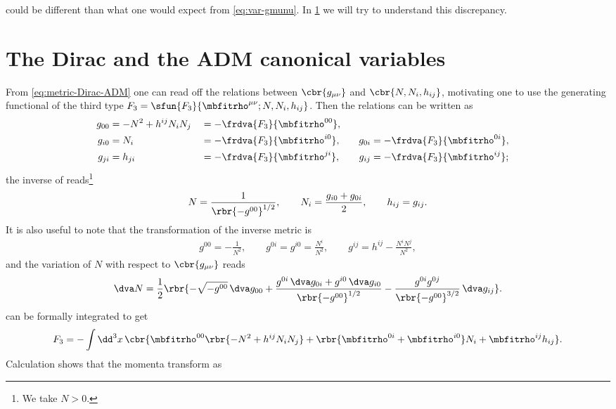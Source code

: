 \documentclass[a4paper,11pt]{article}
\begin{document}
 could be different than what one would expect from 
\cref{eq:var-gmunu}. In \cref{sec:Dirac-ADM-canonical} we will try to 
understand this discrepancy.

\section{The Dirac and the ADM canonical variables}
\label{sec:Dirac-ADM-canonical}

From \cref{eq:metric-Dirac-ADM} one can read off the relations between 
$\cbr{g_{\mu\nu}}$ and $\cbr{N, N_i, h_{ij}}$, motivating one to use the 
generating functional of the third type $F_3 = \sfun{F_3}{\mbfitrho^{\mu\nu}; 
N, N_i, h_{ij}}$. Then the relations can be written as
\begin{alignat}{5}
g_{00}
&= -N^2 + h^{ij} N_i N_j
&&= -\frdva{F_3}{\mbfitrho^{00}},
\label{eq:g00nnh}\\
g_{i0} 
&= N_i
&&= -\frdva{F_3}{\mbfitrho^{i0}}, \quad
&g_{0i}
&= -\frdva{F_3}{\mbfitrho^{0i}},
\label{eq:g0innh}\\
g_{ji}
&= h_{ji}
&&= -\frdva{F_3}{\mbfitrho^{ji}}, \quad
&g_{ij}
&= -\frdva{F_3}{\mbfitrho^{ij}};
\label{eq:gijnnh}
\end{alignat}
the inverse of  reads\footnote{We take $N > 0$.}
\begin{align}
N = \frac{1}{\rbr{-g^{00}}^{1/2}},\qquad
N_i = \frac{g_{i0} + g_{0i}}{2},\qquad
h_{ij} = g_{ij}.
\end{align}
It is also useful to note that the transformation of the inverse metric is
\begin{align}
g^{00} = -\frac{1}{N^2}, \qquad
g^{0i} = g^{i0} = \frac{N^i}{N^2}, \qquad
g^{ij} = h^{ij}-\frac{N^i N^j}{N^2},
\end{align}
and the variation of $N$ with respect to $\cbr{g_{\mu\nu}}$ reads
\begin{align}
\dva N = \frac{1}{2}\rbr{-\sqrt{-g^{00}}\,\dva g_{00}
+\frac{g^{0i}\,\dva g_{0i}+g^{i0}\,\dva g_{i0}}{\rbr{-g^{00}}^{1/2}}
-\frac{g^{0i}g^{0j}}{\rbr{-g^{00}}^{3/2}}\,\dva g_{ij}}.
\end{align}
 can be formally integrated to get
\begin{align}
F_3 = - \int \dd^3 x\,\cbr{\mbfitrho^{00}\rbr{-N^2+h^{ij}N_i N_j}
+\rbr{\mbfitrho^{0i}+\mbfitrho^{i0}} N_i + \mbfitrho^{ij}h_{ij}}.
\end{align}
Calculation shows that the momenta transform as
\end{document}
